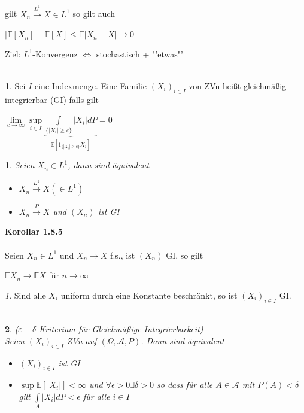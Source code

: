 \documentclass[10pt,a4paper]{report}
\newcommand{\E}{\mathbb{E}}
\numberwithin{equation}{section}
\numberwithin{figure}{section}
\theoremstyle{plain}
\theoremstyle{definition}
\newtheorem{defn}{\protect\definitionname}[section]
\theoremstyle{plain}
\newtheorem{prop}{\protect\propositionname}[section]
\theoremstyle{definition}
\theoremstyle{remark}
\newtheorem{rem}{\protect\remarkname}[section]
\theoremstyle{plain}
\theoremstyle{plain}
\theoremstyle{plain}
\theoremstyle{plain}
\theoremstyle{plain}
\providecommand{\definitionname}{Definition}
\providecommand{\propositionname}{Satz}
\providecommand{\remarkname}{Bemerkung}
\newcommand{\1}{ \mathbb{1} } %
\begin{document}
$ $\\\\
gilt $X_n\overset{L^1}{\to} X \in L^1$ so gilt auch
\begin{center}
$|\E[X_n]-\E[X] \leq \E|X_n-X| \to 0$
\end{center}
Ziel: $L^1$-Konvergenz $\Leftrightarrow$ stochastisch + "'etwas"'\\\\
\begin{defn}
  Sei $I$ eine Indexmenge. Eine Familie $(X_i)_{i \in I}$ von ZVn
  heißt gleichmäßig integrierbar (GI) falls gilt
  \begin{center}
    $\lim\limits_{c \to \infty} \sup\limits_{i \in I}
    \underbrace{\int\limits_{\{|X_i|\geq
        c\}}|X_i|dP}_{\E[1_{\{|X_i|\geq c\}}X_i]}=0 $
  \end{center}
\end{defn}
\begin{prop}
  Seien $X_n \in L^1$, dann sind äquivalent
  \begin{itemize}
  \item[i)] $X_n \overset{L^1}{\to} X (\in L^1)$
  \item[ii)] $X_n \overset{P}{\to} X$ und $(X_n)$ ist GI
  \end{itemize}
\end{prop}
\textbf{Korollar 1.8.5}\\\\
Seien $X_n \in L^1$ und $X_n \to X$ f.s., ist $(X_n)$ GI, so gilt
\begin{center}
$\E X_n \to \E X$ für $n \to \infty$
\end{center} 
\begin{rem}
  Sind alle $X_i$ uniform durch eine Konstante beschränkt, so ist $(X_i)_{i \in I}$ GI.\\\\
\end{rem}
\begin{prop} ($\varepsilon - \delta$ Kriterium für Gleichmäßige Integrierbarkeit)\\
  Seien $(X_i)_{i \in I}$ ZVn auf $(\Omega, \mathcal{A},P)$. Dann sind
  äquivalent
  \begin{itemize}
  \item[i)] $(X_i)_{i \in I}$ ist GI
  \item[ii)] $\sup \E [|X_i|]< \infty$ und $\forall \epsilon > 0
    \exists \delta >0$ so dass für alle $A \in \mathcal{A}$ mit $P(A)<
    \delta$ gilt $\int\limits_A |X_i|dP<\epsilon$ für alle $i \in I$
  \end{itemize}
\end{prop}
\end{document}
